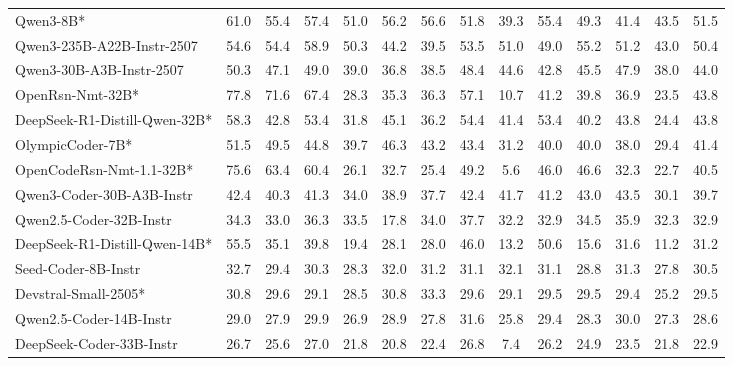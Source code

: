 \begin{table}[hbt]
{\begin{tabular}{l *{13}{c}}
Qwen3-8B* &	61.0&	55.4&	57.4&	51.0&	56.2&	56.6&	51.8&	39.3&	55.4&	49.3&	41.4&	43.5&	51.5\\															
\rowcolor{gray!10}
Qwen3-235B-A22B-Instr-2507 &	54.6&	54.4&	58.9&	50.3&	44.2&	39.5&	53.5&	51.0&	49.0&	55.2&	51.2&	43.0&	50.4\\															
Qwen3-30B-A3B-Instr-2507 &	50.3&	47.1&	49.0&	39.0&	36.8&	38.5&	48.4&	44.6&	42.8&	45.5&	47.9&	38.0&	44.0\\											
\rowcolor{gray!10}
OpenRsn-Nmt-32B* &	77.8&	71.6&	67.4&	28.3&	35.3&	36.3&	57.1&	10.7&	41.2&	39.8&	36.9&	23.5&	43.8\\														
DeepSeek-R1-Distill-Qwen-32B* &	58.3&	42.8&	53.4&	31.8&	45.1&	36.2&	54.4&	41.4&	53.4&	40.2&	43.8&	24.4&	43.8\\											
\rowcolor{gray!10}
OlympicCoder-7B* & 51.5&	49.5&	44.8&	39.7&	46.3&	43.2&	43.4&	31.2&	40.0&	40.0&	38.0&	29.4&	41.4\\														
OpenCodeRsn-Nmt-1.1-32B*&	75.6&	63.4&	60.4&	26.1&	32.7&	25.4&	49.2&	5.6&	46.0&	46.6&	32.3&	22.7&	40.5\\												
\rowcolor{gray!10}
Qwen3-Coder-30B-A3B-Instr&	42.4&	40.3&	41.3&	34.0&	38.9&	37.7&	42.4&	41.7&	41.2&	43.0&	43.5&	30.1&	39.7\\														
Qwen2.5-Coder-32B-Instr&	34.3&	33.0&	36.3&	33.5&	17.8&	34.0&	37.7&	32.2&	32.9&	34.5&	35.9&	32.3&	32.9\\								
\rowcolor{gray!10}
DeepSeek-R1-Distill-Qwen-14B*&	55.5&	35.1&	39.8&	19.4&	28.1&	28.0&	46.0&	13.2&	50.6&	15.6&	31.6&	11.2&	31.2\\													
Seed-Coder-8B-Instr&	32.7&	29.4&	30.3&	28.3&	32.0&	31.2&	31.1&	32.1&	31.1&	28.8&	31.3&	27.8&	30.5\\									
\rowcolor{gray!10}
Devstral-Small-2505* &	30.8&	29.6&	29.1&	28.5&	30.8&	33.3&	29.6&	29.1&	29.5&	29.5&	29.4&	25.2&	29.5\\												
Qwen2.5-Coder-14B-Instr&	29.0&	27.9&	29.9&	26.9&	28.9&	27.8&	31.6&	25.8&	29.4&	28.3&	30.0&	27.3&	28.6\\							
\rowcolor{gray!10}
DeepSeek-Coder-33B-Instr&	26.7&	25.6&	27.0&	21.8&	20.8&	22.4&	26.8&	7.4&	26.2&	24.9&	23.5&	21.8&	22.9\\														
													
\bottomrule
\end{tabular}%
}
\end{table}
